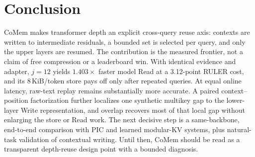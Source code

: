 \section{Conclusion}
\label{sec:conclusion}

CoMem makes transformer depth an explicit cross-query reuse axis: contexts are
written to intermediate residuals, a bounded set is selected per query, and only
the upper layers are resumed. The contribution is the measured frontier, not a
claim of free compression or a leaderboard win. With identical evidence and
adapter, $j{=}12$ yields $1.403\times$ faster model Read at a 3.12-point RULER
cost, and its 8\,KiB/token store pays off only after repeated queries. At equal
online latency, raw-text replay remains substantially more accurate. A paired
context--position factorization further localizes one synthetic multikey gap to
the lower-layer Write representation, and overlap recovers most of that local
gap without enlarging the store or Read work. The next decisive step is a
same-backbone, end-to-end comparison with PIC and learned modular-KV systems,
plus natural-task validation of contextual writing. Until then, CoMem should be
read as a transparent depth-reuse design point with a bounded diagnosis.
